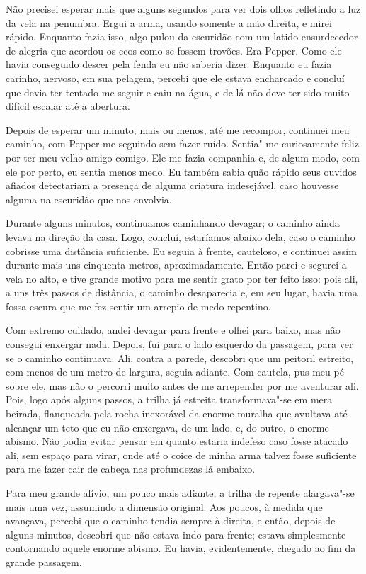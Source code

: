 Não precisei esperar mais que alguns segundos para ver dois olhos refletindo a luz da vela na penumbra. Ergui a arma,
usando somente a mão direita, e mirei rápido. Enquanto fazia isso, algo pulou da escuridão com um latido ensurdecedor
de alegria que acordou os ecos como se fossem trovões. Era Pepper. Como ele havia conseguido descer pela fenda eu não
saberia dizer. Enquanto eu fazia carinho, nervoso, em sua pelagem, percebi que ele estava encharcado e concluí que
devia ter tentado me seguir e caiu na água, e de lá não deve ter sido muito difícil escalar até a abertura.

Depois de esperar um minuto, mais ou menos, até me recompor, continuei meu caminho, com Pepper me seguindo sem fazer
ruído. Sentia"-me curiosamente feliz por ter meu velho amigo comigo. Ele me fazia companhia e, de algum modo, com ele
por perto, eu sentia menos medo. Eu também sabia quão rápido seus ouvidos afiados detectariam a presença de alguma
criatura indesejável, caso houvesse alguma na escuridão que nos envolvia.

Durante alguns minutos, continuamos caminhando devagar; o caminho ainda levava na direção da casa. Logo, concluí,
estaríamos abaixo dela, caso o caminho cobrisse uma distância suficiente. Eu seguia à frente, cauteloso, e
continuei assim durante mais uns cinquenta metros, aproximadamente. Então parei e segurei a vela no alto, e tive
grande motivo para me sentir grato por ter feito isso: pois ali, a uns três passos de distância, o caminho desaparecia
e, em seu lugar, havia uma fossa escura que me fez sentir um arrepio de medo repentino.

Com extremo cuidado, andei devagar para frente e olhei para baixo, mas não consegui enxergar nada. Depois, fui para o
lado esquerdo da passagem, para ver se o caminho continuava. Ali, contra a parede, descobri que um peitoril estreito,
com menos de um metro de largura, seguia adiante. Com cautela, pus meu pé sobre ele, mas não o percorri muito antes de
me arrepender por me aventurar ali. Pois, logo após alguns passos, a trilha já estreita transformava"-se em mera
beirada, flanqueada pela rocha inexorável da enorme muralha que avultava até alcançar um teto que eu não enxergava, de
um lado, e, do outro, o enorme abismo. Não podia evitar pensar em quanto estaria indefeso caso fosse atacado ali, sem
espaço para virar, onde até o coice de minha arma talvez fosse suficiente para me fazer cair de cabeça nas profundezas
lá embaixo.

Para meu grande alívio, um pouco mais adiante, a trilha de repente alargava"-se mais uma vez, assumindo a dimensão
original. Aos poucos, à medida que avançava, percebi que o caminho tendia sempre à direita, e então, depois de alguns
minutos, descobri que não estava indo para frente; estava simplesmente contornando aquele enorme abismo. Eu havia,
evidentemente, chegado ao fim da grande passagem.

